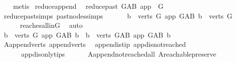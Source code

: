 \begin{isabellebody}
\ \ \isamarkupfalse%
\ metis%
\endisatagproof
{\isafoldproof}%
%
\isadelimproof
\isanewline
%
\endisadelimproof
\isanewline
\isanewline
\isanewline
{}\isamarkupfalse%
\ reduce{\isacharunderscore}{\kern0pt}append{}{\isacharcolon}{\kern0pt}\isanewline
\ \ {\isachardoublequoteopen}reduce{\isacharunderscore}{\kern0pt}past\ G{\isacharunderscore}{\kern0pt}AB\ app\ {\isacharequal}{\kern0pt}\ G{\isachardoublequoteclose}\isanewline
%
\isadelimproof
\ \ %
\endisadelimproof
%
\isatagproof
{}\isamarkupfalse%
\ reduce{\isacharunderscore}{\kern0pt}past{\isachardot}{\kern0pt}simps\ past{\isacharunderscore}{\kern0pt}nodes{\isachardot}{\kern0pt}simps\ \isanewline
{}\isamarkupfalse%
\ {\isacharminus}{\kern0pt}\isanewline
\ \ \isamarkupfalse%
\ {\isachardoublequoteopen}{\isacharbraceleft}{\kern0pt}b\ {\isasymin}\ verts\ G{\isachardot}{\kern0pt}\ app\ {\isasymrightarrow}\isactrlsup {\isacharplus}{\kern0pt}\isactrlbsub G{\isacharunderscore}{\kern0pt}AB\isactrlesub \ b{\isacharbraceright}{\kern0pt}\ {\isacharequal}{\kern0pt}\ verts\ G{\isachardoublequoteclose}\isanewline
\ \ \ \ \isamarkupfalse%
\ reaches{\isacharunderscore}{\kern0pt}all{\isacharunderscore}{\kern0pt}in{\isacharunderscore}{\kern0pt}G\ \isamarkupfalse%
\ auto\isanewline
\ \ \isamarkupfalse%
\ \isamarkupfalse%
\ {\isachardoublequoteopen}{\isacharbraceleft}{\kern0pt}b\ {\isasymin}\ verts\ G{\isachardot}{\kern0pt}\ app\ {\isasymrightarrow}\isactrlsup {\isacharplus}{\kern0pt}\isactrlbsub G{\isacharunderscore}{\kern0pt}AB\isactrlesub \ b{\isacharbraceright}{\kern0pt}\ {\isacharequal}{\kern0pt}\ {\isacharbraceleft}{\kern0pt}b\ {\isasymin}\ verts\ G{\isacharunderscore}{\kern0pt}AB{\isachardot}{\kern0pt}\ app\ {\isasymrightarrow}\isactrlsup {\isacharplus}{\kern0pt}\isactrlbsub G{\isacharunderscore}{\kern0pt}AB\isactrlesub \ b{\isacharbraceright}{\kern0pt}{\isachardoublequoteclose}\isanewline
\ \ \ \ \isamarkupfalse%
\ A{}{\isachardot}{\kern0pt}append{\isacharunderscore}{\kern0pt}verts\ append{\isacharunderscore}{\kern0pt}verts\ \isamarkupfalse%
\ append{\isacharunderscore}{\kern0pt}is{\isacharunderscore}{\kern0pt}tip\ app{\isacharunderscore}{\kern0pt}dis{\isacharunderscore}{\kern0pt}not{\isacharunderscore}{\kern0pt}reached\isanewline
\ \ \ \ \ \ app{\isacharunderscore}{\kern0pt}dis{\isacharunderscore}{\kern0pt}only{\isacharunderscore}{\kern0pt}tips\isanewline
\ \ \ \ \ \ A{}{\isachardot}{\kern0pt}append{\isacharunderscore}{\kern0pt}not{\isacharunderscore}{\kern0pt}reached{\isacharunderscore}{\kern0pt}all\ A{}{\isachardot}{\kern0pt}reachable{}{\isacharunderscore}{\kern0pt}preserve\ \isamarkupfalse%

\end{isabellebody}
